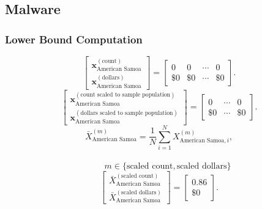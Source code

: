 \subsection{Malware}
\subsubsection{Lower Bound Computation}
\[
\begin{bmatrix}
\mathbf{x}_{\text{American Samoa}}^{(\text{count})}\\
\mathbf{x}_{\text{American Samoa}}^{(\text{dollars})}
\end{bmatrix}
=
\begin{bmatrix}
0 & 0 & \cdots & 0\\
\$0 &\$0 & \cdots &\$0 
\end{bmatrix}.
\]
\[
\begin{bmatrix}
\mathbf{x}_{\text{American Samoa}}^{(\text{count scaled to sample population})}\\
\mathbf{x}_{\text{American Samoa}}^{(\text{dollars scaled to sample population})}
\end{bmatrix}
=
\begin{bmatrix}
0 & \cdots & 0\\
\$0 & \cdots &\$0
\end{bmatrix}.
\]
  \[
\bar{X}_{\text{American Samoa}}^{(m)}
= \frac{1}{N}\sum_{i=1}^{N} X_{\text{American Samoa},i}^{(m)},
\]
\\
\[
\qquad
m \in \{\text{scaled count},\text{scaled dollars}\}
\]
\[
\begin{bmatrix}
\bar{X}_{\text{American Samoa}}^{(\text{scaled count})}\\
\bar{X}_{\text{American Samoa}}^{(\text{scaled dollars})}
\end{bmatrix}
=
\begin{bmatrix}
0.86\\
\$0
\end{bmatrix}.
\]
